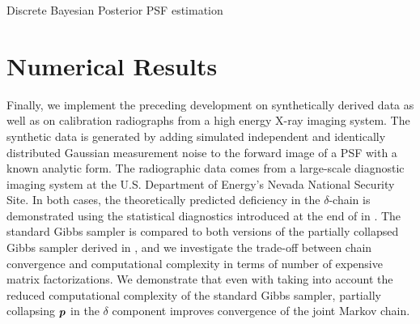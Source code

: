 \begin{chapter}{Discrete Bayesian Posterior PSF estimation}
\section{Numerical Results} \label{chapter:results}
Finally, we implement the preceding development on synthetically derived data as well as on calibration radiographs from a high energy X-ray imaging system.
The synthetic data is generated by adding simulated independent and identically distributed Gaussian measurement noise to the forward image of a PSF with a known analytic form.
The radiographic data comes from a large-scale diagnostic imaging system at the U.S. Department of Energy's Nevada National Security Site.
In both cases, the theoretically predicted deficiency in the $\delta$-chain is demonstrated using the statistical diagnostics introduced at the end of  in .
The standard Gibbs sampler is compared to both versions of the partially collapsed Gibbs sampler derived in , and we investigate the trade-off between chain convergence and computational complexity in terms of number of expensive matrix factorizations.
We demonstrate that even with taking into account the reduced computational complexity of the standard Gibbs sampler, partially collapsing $\mbox{\boldmath$p$}$ in the $\delta$ component improves convergence of the joint Markov chain.


\end{chapter}
